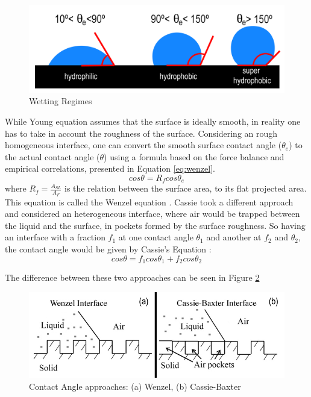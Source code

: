 \begin{figure}[h]
\centering
\includegraphics[width=0.7\linewidth]{Figures/2.Chapter/wet.png}
\caption{Wetting Regimes}
\label{fig:wet}
\end{figure}

\par While Young equation assumes that the surface is ideally smooth, in reality one has to take in account the roughness of the surface. Considering an rough homogeneous interface, one can convert the smooth surface contact angle ($\theta_e$) to the actual contact angle ($\theta$) using a formula based on the force balance and empirical correlations, presented in Equation \ref{eq:wenzel}. 
\begin{equation}\label{eq:wenzel}
cos \theta = R_f cos \theta_e
\end{equation}
where $R_f= \frac{A_{SL}}{A_{F}}$ is the relation between the surface area, to its flat projected area. This equation is called the Wenzel equation \cite{wenzel1936resistance}. Cassie took a different approach and considered an heterogeneous interface, where air would be trapped between the liquid and the surface, in pockets formed by the surface roughness. So having an interface with a fraction $f_1$ at one contact angle $\theta_1$ and another at $f_2$ and $\theta_2$, the contact angle would be given by Cassie's Equation \cite{cassie1944wettability} :
\begin{equation}\label{eq:cassie}
cos \theta = f_1 cos \theta_1 + f_2 cos \theta_2
\end{equation}
\par The difference between these two approaches can be seen in Figure \ref{fig:wenzelcassie}

\begin{figure}[h]
\centering
\includegraphics[width=0.7\linewidth]{Figures/2.Chapter/wenzelcassie.png}
\caption{Contact Angle approaches: (a) Wenzel, (b) Cassie-Baxter}
\label{fig:wenzelcassie}
\end{figure}


